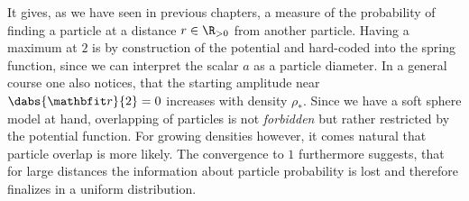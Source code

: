 It gives, as we have seen in previous chapters, a measure of the probability of finding a particle at a distance $r\in\R_{>0}$ from another particle. Having a maximum at $2$ is by construction of the potential and hard-coded into the spring function, since we can interpret the scalar $a$ as a particle diameter. In a general course one also notices, that the starting amplitude near $\dabs{\vr}{2} = 0$ increases with density $\rho_*$. Since we have a soft sphere model at hand, overlapping of particles is not \emph{forbidden} but rather restricted by the potential function. For growing densities however, it comes natural that particle overlap is more likely. The convergence to $1$ furthermore suggests, that for large distances the information about particle probability is lost and therefore finalizes in a uniform distribution. 

